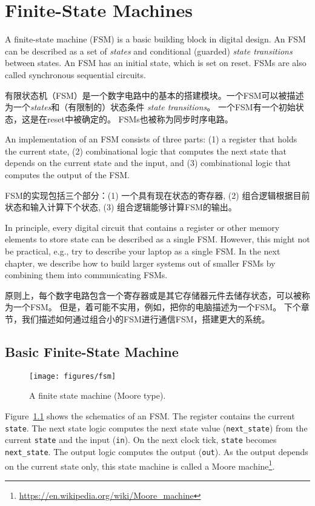 \documentclass[%
    10pt,
    headinclude, footexclude,
    openright, %
    notitlepage,
    cleardoubleempty,
    headsepline,
    pointlessnumbers,
    bibtotoc, idxtotoc,
    ]{scrbook}
\newcommand{\code}[1]{{\small{\texttt{#1}}}}
\newcommand{\scale}{0.7}
\newcommand{\todo}[1]{{\emph{TODO: #1}}}
\newcommand{\myref}[2]{\href{#1}{#2}}
\renewcommand{\myref}[2]{{#2}{\footnote{\url{#1}}}}
\renewcommand{\todo}[1]{}
\begin{document}
\todo{Luca: More exercises would be nice. Maybe in the future?}

\chapter{Finite-State Machines}

A finite-state machine (FSM) is a basic building block in digital design.
An FSM can be described as a set of \emph{states} and conditional (guarded)
\emph{state transitions} between states. 
An FSM has an initial state, which is set on reset.
FSMs are also called synchronous sequential circuits.

有限状态机（FSM）是一个数字电路中的基本的搭建模块。一个FSM可以被描述为一个\emph{states}和（有限制的）状态条件
\emph{state transitions}。
一个FSM有一个初始状态，这是在reset中被确定的。
FSMs也被称为同步时序电路。


An implementation of an FSM consists of three parts: (1) a register that holds the current state,
(2) combinational logic that computes the next state that depends on the current
state and the input, and (3) combinational logic that computes the output of the FSM.

FSM的实现包括三个部分：(1) 一个具有现在状态的寄存器,
(2) 组合逻辑根据目前状态和输入计算下个状态,  
(3) 组合逻辑能够计算FSM的输出。

In principle, every digital circuit that contains a register or other memory elements
to store state can be described as a single FSM. However, this might
not be practical, e.g., try to describe your laptop as a single FSM.
In the next chapter, we describe how to build larger systems
out of smaller FSMs by combining them into communicating FSMs.

原则上，每个数字电路包含一个寄存器或是其它存储器元件去储存状态，可以被称为一个FSM。
但是，着可能不实用，例如，把你的电脑描述为一个FSM。
下个章节，我们描述如何通过组合小的FSM进行通信FSM，搭建更大的系统。

\section{Basic Finite-State Machine}

\begin{figure}
  \centering
  \texttt{[image: figures/fsm]}
  \caption{A finite state machine (Moore type).}
  \label{fig:fsm}
\end{figure}

Figure~\ref{fig:fsm} shows the schematics of an FSM. The register contains the current \code{state}.
The next state logic computes the next state value (\code{next\_state})
from the current \code{state} and the input (\code{in}).
On the next clock tick, \code{state} becomes \code{next\_state}.
The output logic computes the output (\code{out}). As the output depends on the current
state only, this state machine is called a
\myref{https://en.wikipedia.org/wiki/Moore_machine}{Moore machine}.
\end{document}
